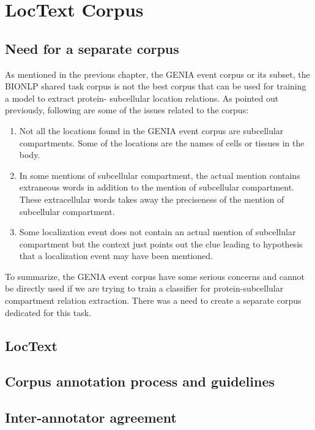 \chapter{LocText Corpus}\label{chapter:corpus}

\section{Need for a separate corpus}

As mentioned in the previous chapter, the GENIA event corpus or its subset, the BIONLP shared task corpus is not the best corpus that can be used for training a model to extract protein- subcellular location relations. As pointed out previously, following are some of the issues related to the corpus:
\begin{enumerate}
\item Not all the locations found in the GENIA event corpus are subcellular compartments. Some of the locations are the names of cells or tissues in the body.
\item In some mentions of subcellular compartment, the actual mention contains extraneous words in addition to the mention of subcellular compartment. These extracellular words takes away the preciseness of the mention of subcellular compartment.
\item Some localization event does not contain an actual mention of subcellular compartment but the context just points out the clue leading to hypothesis that a localization event may have been mentioned.
\end{enumerate}

To summarize, the GENIA event corpus have some serious concerns and cannot be directly used if we are trying to train a classifier for protein-subcellular compartment relation extraction. There was a need to create a separate corpus dedicated for this task.

\section{LocText}

\section{Corpus annotation process and guidelines}

\section{Inter-annotator agreement}

